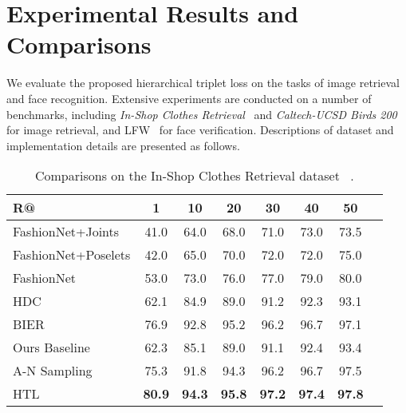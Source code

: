 \documentclass[runningheads]{llncs}
\begin{document}
 	
\section{Experimental Results and Comparisons}

We evaluate the proposed hierarchical triplet loss on the tasks of image retrieval and face recognition. Extensive experiments are conducted on a number of benchmarks, including \emph{In-Shop Clothes Retrieval}~\cite{liu2016deepfashion} and \emph{Caltech-UCSD Birds 200}~\cite{wah2011caltech} for image retrieval, and LFW~\cite{LFWTech} for face verification. Descriptions of dataset and implementation details are presented as follows.

\begin{table*}[t]\small
\setlength{\abovecaptionskip}{10pt}
\setlength{\belowcaptionskip}{-10pt}
\begin{center}
\resizebox{0.65\textwidth}{!}
{
\begin{tabular}{@{}lccccccc@{}}
\toprule
R@                                    & 1         &10      &20       &30      &40        &50     \\ \midrule
FashionNet+Joints\cite{liu2016deepfashion}  & 41.0      &64.0    &68.0     &71.0    &73.0      &73.5   \\
FashionNet+Poselets\cite{liu2016deepfashion}& 42.0      &65.0    &70.0     &72.0    &72.0      &75.0   \\
FashionNet\cite{liu2016deepfashion}         & 53.0      &73.0    &76.0     &77.0    &79.0      &80.0   \\
HDC\cite{Yuan_2017_ICCV}                & 62.1      &84.9    &89.0     &91.2    &92.3      &93.1   \\
BIER\cite{opitz2017bier}               & 76.9      &92.8    &95.2     &96.2    &96.7     &97.1   \\\midrule
Ours Baseline                         & 62.3      &85.1  &89.0          &91.1  &92.4    &93.4   \\
A-N Sampling              & 75.3        &91.8  &94.3          &96.2  &96.7           &97.5\\
HTL            &\textbf{80.9}  &\textbf{94.3}  &\textbf{95.8}          &\textbf{97.2}          &\textbf{97.4} &\textbf{97.8}\\
\bottomrule
\end{tabular}
}
\end{center}
\caption{Comparisons on the In-Shop Clothes Retrieval dataset ~\cite{liu2016deepfashion}.}
\label{In-Shop Clothes dataset}
\end{table*}
\end{document}
